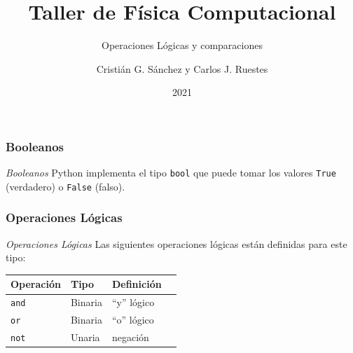 \documentclass{beamer}
\title{Taller de Física Computacional}
\subtitle{Operaciones Lógicas y comparaciones}
\author{Cristián G. Sánchez y Carlos J. Ruestes}
\date{2021}
\begin{document}
\frame{\titlepage}

\begin{frame}[fragile]
    \frametitle{Booleanos}
    \begin{block}{{\em Booleanos}}
    Python implementa el tipo \texttt{bool} que puede tomar los valores \texttt{True} (verdadero)
    o \texttt{False} (falso). 
    \end{block}

    \end{frame}

\begin{frame}[fragile]
    \frametitle{Operaciones Lógicas}
    \begin{block}{{\em Operaciones Lógicas}}
     Las siguientes operaciones lógicas están definidas para este tipo:
        \begin{center}
            \begin{table}[]
                \begin{tabular}{@{}llll@{}}
                \toprule
                 Operación & Tipo & Definición  \\ \midrule
                 \texttt{and} & Binaria & ``y'' lógico   \\
                 \texttt{or}  & Binaria & ``o'' lógico  \\ 
                 \texttt{not} & Unaria  & negación  \\ \bottomrule
                \end{tabular}
            \end{table}
        \end{center}
    \end{block}
    \end{frame}
\end{document}
